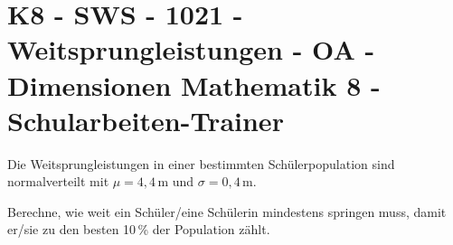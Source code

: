 \section{K8 - SWS - 1021 - Weitsprungleistungen - OA - Dimensionen Mathematik 8 - Schularbeiten-Trainer}

\begin{beispiel}[K8 - SWS]{1}
Die Weitsprungleistungen in einer bestimmten Schülerpopulation sind normalverteilt mit $\mu=4,4$\,m und $\sigma=0,4$\,m.

Berechne, wie weit ein Schüler/eine Schülerin mindestens springen muss, damit er/sie zu den besten 10\,\% der Population zählt.

\end{beispiel}